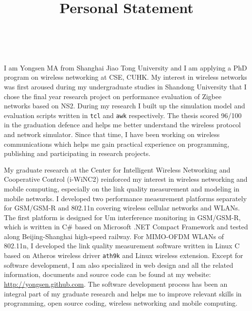 \documentclass[conference,onecolumn]{IEEEtran}
\title{Personal Statement}
\author{\IEEEauthorblockN{Yongsen MA} \\
}
\begin{document}
\maketitle%

I am Yongsen MA from Shanghai Jiao Tong University and I am applying a PhD program on wireless networking at CSE, CUHK. My interest in wireless networks was first aroused during my undergraduate studies in Shandong University that I chose the final year research project on performance evaluation of Zigbee networks based on NS2. During my research I built up the simulation model and evaluation scripts written in \verb"tcl" and \verb"awk" respectively. The thesis scored 96/100 in the graduation defence and helps me better understand the wireless protocol and network simulator. Since that time, I have been working on wireless communications which helps me gain practical experience on programming, publishing and participating in research projects.

My graduate research at the Center for Intelligent Wireless Networking and Cooperative Control (i-WiNC2) reinforced my interest in wireless networking and mobile computing, especially on the link quality measurement and modeling in mobile networks. I developed two performance measurement platforms separately for GSM/GSM-R and 802.11n covering wireless cellular networks and WLANs. The first platform is designed for Um interference monitoring in GSM/GSM-R, which is written in C\# based on Microsoft .NET Compact Framework and tested along Beijing-Shanghai high-speed railway. For MIMO-OFDM WLANs of 802.11n, I developed the link quality measurement software written in Linux C based on Atheros wireless driver \texttt{ath9k} and Linux wireless extension. Except for software development, I am also specialized in web design and all the related information, documents and source code can be found at my website: \url{http://yongsen.github.com}. The software development process has been an integral part of my graduate research and helps me to improve relevant skills in programming, open source coding, wireless networking and mobile computing.
\end{document}
